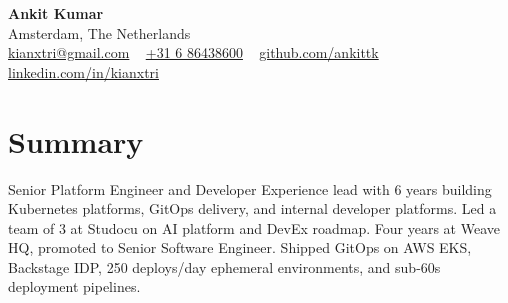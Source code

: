 \documentclass[letterpaper,11pt]{article}
\begin{document}
\linespread{1.03}\selectfont
\begin{center}
  {\LARGE\textbf{Ankit Kumar}} \\
  \vspace{2pt}
  \small
  Amsterdam, The Netherlands \\
  \vspace{2pt}
  \href{mailto:kianxtri@gmail.com}{kianxtri@gmail.com} \textperiodcentered\ %
  \href{tel:+31686438600}{+31 6 86438600} \textperiodcentered\ %
  \href{https://github.com/ankittk}{github.com/ankittk} \textperiodcentered\ %
  \href{https://www.linkedin.com/in/kianxtri/}{linkedin.com/in/kianxtri}
\end{center}


\vspace{-6pt}
\section*{Summary}
\begin{small}
Senior Platform Engineer and Developer Experience lead with 6 years building Kubernetes platforms, GitOps delivery, and internal developer platforms. Led a team of 3 at Studocu on AI platform and DevEx roadmap. Four years at Weave HQ, promoted to Senior Software Engineer. Shipped GitOps on AWS EKS, Backstage IDP, 250 deploys/day ephemeral environments, and sub-60s deployment pipelines.
\end{small}
\vspace{-4pt}
\end{document}
